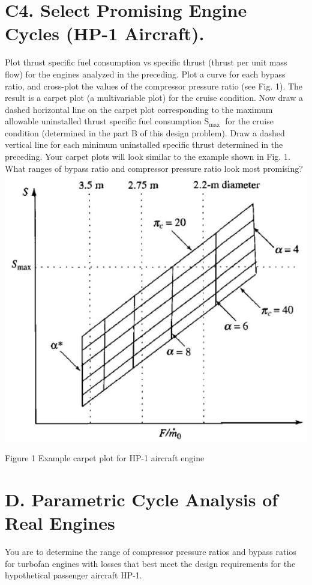 \documentclass[10pt]{article}
\begin{document}
\section*{C4. Select Promising Engine Cycles (HP-1 Aircraft).}
Plot thrust specific fuel consumption vs specific thrust (thrust per unit mass flow) for the engines analyzed in the preceding. Plot a curve for each bypass ratio, and cross-plot the values of the compressor pressure ratio (see Fig. 1). The result is a carpet plot (a multivariable plot) for the cruise condition. Now draw a dashed horizontal line on the carpet plot corresponding to the maximum allowable uninstalled thrust specific fuel consumption $\mathrm{S}_{\text {max }}$ for the cruise condition (determined in the part B of this design problem). Draw a dashed vertical line for each minimum uninstalled specific thrust determined in the preceding. Your carpet plots will look similar to the example shown in Fig. 1. What ranges of bypass ratio and compressor pressure ratio look most promising?\\
\includegraphics[max width=\textwidth, center]{plot-S-Fm}

Figure 1 Example carpet plot for HP-1 aircraft engine

\section*{D. Parametric Cycle Analysis of Real Engines}
You are to determine the range of compressor pressure ratios and bypass ratios for turbofan engines with losses that best meet the design requirements for the hypothetical passenger aircraft HP-1.
\end{document}
